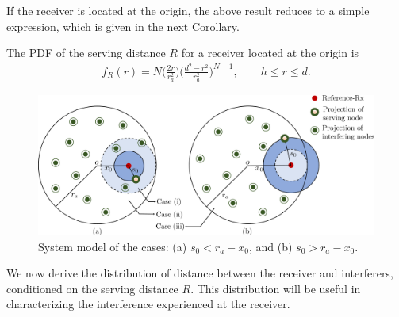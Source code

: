 \documentclass[journal,draftclsnofoot,onecolumn,12pt]{IEEEtran}
\begin{document}
If the receiver is located at the origin, the above result reduces to a simple expression, which is given in the next Corollary.
\begin{cor}
The PDF of the serving distance $R$ for a receiver located at the origin is
\begin{align}
f_{R}(r) =  N\Bigg(\frac{2r}{r_a^2}\Bigg)\Bigg(\frac{d^2-r^2}{r_a^2}\Bigg)^{N-1},\qquad     h \leq r \leq d .
\end{align}
\end{cor}
\begin{figure}
\centering
\includegraphics[scale=.32]{./sysmod3b}
\caption{System model of the cases: (a) $s_0<r_a-x_0$, and (b) $s_0>r_a-x_0$.}
\label{fig:cases}
\end{figure}
We now derive the distribution of distance between the receiver and interferers, conditioned on the serving distance $R$. This distribution will be useful in characterizing the interference experienced at the receiver.
\end{document}
